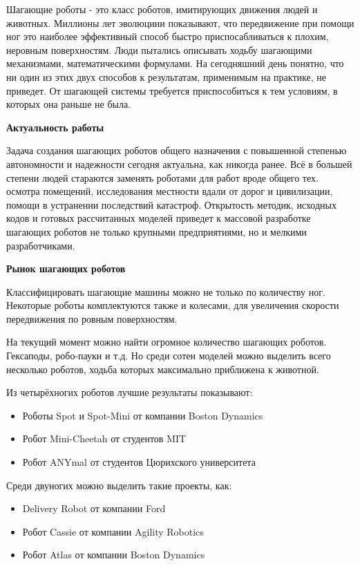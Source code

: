 
Шагающие роботы - это класс роботов, имитирующих движения людей и животных. Миллионы лет эволюциии показывают, что передвижение при помощи ног это наиболее эффективный способ быстро приспосабливаться к плохим, неровным поверхностям. Люди пытались описывать ходьбу шагающими механизмами, математическими формулами. На сегодняшний день понятно, что ни один из этих двух способов к результатам, применимым на практике, не приведет. От шагающей системы требуется приспособиться к тем условиям, в которых она раньше не была.

\textbf{Актуальность работы}

Задача создания шагающих роботов общего назначения с повышенной степенью автономности и надежности сегодня актуальна, как никогда ранее. Всё в большей степени людей стараются заменять роботами для работ вроде общего тех. осмотра помещений, исследования местности вдали от дорог и цивилизации, помощи в устранении последствий катастроф. Открытость методик, исходных кодов и готовых рассчитанных моделей приведет к массовой разработке шагающих роботов не только крупными предприятиями, но и мелкими разработчиками.

\textbf{Рынок шагающих роботов}

Классифицировать шагающие машины можно не только по количеству ног. Некоторые роботы комплектуются также и колесами, для увеличения скорости передвижения по ровным поверхностям. 

На текущий момент можно найти огромное количество шагающих роботов. Гексаподы, робо-пауки и т.д. Но среди сотен моделей можно выделить всего несколько роботов, ходьба которых максимально приближена к животной.

Из четырёхногих роботов лучшие результаты показывают:
\begin{itemize}
    \item Роботы Spot и Spot-Mini от компании Boston Dynamics
    \item Робот Mini-Cheetah от студентов MIT
    \item Робот ANYmal от студентов Цюрихского университета
\end{itemize}

Среди двуногих можно выделить такие проекты, как:

\begin{itemize}
    \item Delivery Robot от компании Ford
    \item Робот Cassie от компании Agility Robotics
    \item Робот Atlas от компании Boston Dynamics
\end{itemize}

